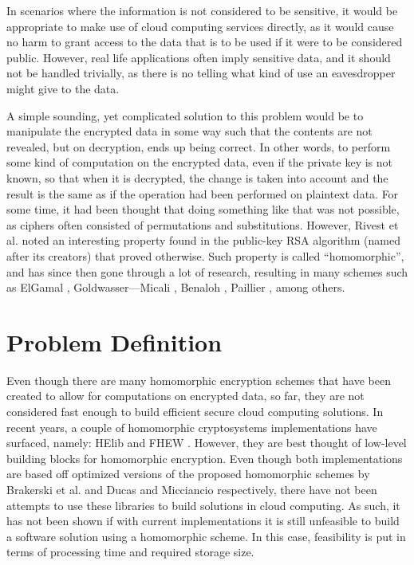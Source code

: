 In scenarios where the information is not considered to be sensitive, it would be appropriate to make use of cloud computing services directly, as it would cause no harm to grant access to the data that is to be used if it were to be considered public. However, real life applications often imply sensitive data, and it should not be handled trivially, as there is no telling what kind of use an eavesdropper might give to the data.

A simple sounding, yet complicated solution to this problem would be to manipulate the encrypted data in some way such that the contents are not revealed, but on decryption, ends up being correct. In other words, to perform some kind of computation on the encrypted data, even if the private key is not known, so that when it is decrypted, the change is taken into account and the result is the same as if the operation had been performed on plaintext data. For some time, it had been thought that doing something like that was not possible, as ciphers often consisted of permutations and substitutions. However, Rivest et al. \cite{rivest1978data} noted an interesting property found in the public-key RSA algorithm (named after its creators) that proved otherwise. Such property is called ``homomorphic'', and has since then gone through a lot of research, resulting in many schemes such as ElGamal \cite{ElGamal:1985:PKC:19478.19480}, Goldwasser---Micali \cite{Goldwasser:1982:PEA:800070.802212}, Benaloh \cite{benaloh1994dense}, Paillier \cite{Paillier:1999:PCB:1756123.1756146}, among others.

\section{Problem Definition}

Even though there are many homomorphic encryption schemes that have been created to allow for computations on encrypted data, so far, they are not considered fast enough to build efficient secure cloud computing solutions. In recent years, a couple of homomorphic cryptosystems implementations have surfaced, namely: HElib \cite{helib} and FHEW \cite{fhew}. However, they are best thought of low-level building blocks for homomorphic encryption. Even though both implementations are based off optimized versions of the proposed homomorphic schemes by Brakerski et al. \cite{cryptoeprint:2011:277} and Ducas and Micciancio \cite{fhew} respectively, there have not been attempts to use these libraries to build solutions in cloud computing. As such, it has not been shown if with current implementations it is still unfeasible to build a software solution using a homomorphic scheme. In this case, feasibility is put in terms of processing time and required storage size. 

